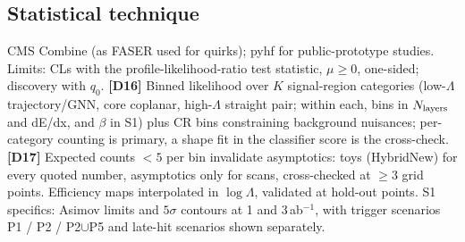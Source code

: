\documentclass[11pt,a4paper]{article}
\newcommand{\lab}[1]{\textbf{[#1]}}
\begin{document}
\subsection{Statistical technique}
CMS Combine (as FASER used for quirks); pyhf for public-prototype studies. Limits: CLs with the profile-likelihood-ratio test statistic, $\mu\geq0$, one-sided; discovery with $q_0$. \lab{D16} Binned likelihood over $K$ signal-region categories (low-$\Lambda$ trajectory/GNN, core coplanar, high-$\Lambda$ straight pair; within each, bins in $N_{\rm layers}$ and dE/dx, and $\beta$ in S1) plus CR bins constraining background nuisances; per-category counting is primary, a shape fit in the classifier score is the cross-check. \lab{D17} Expected counts $<5$ per bin invalidate asymptotics: toys (HybridNew) for every quoted number, asymptotics only for scans, cross-checked at $\geq3$ grid points. Efficiency maps interpolated in $\log\Lambda$, validated at hold-out points. S1 specifics: Asimov limits and $5\sigma$ contours at 1 and 3\,ab$^{-1}$, with trigger scenarios P1 / P2 / P2$\cup$P5 and late-hit scenarios shown separately.
\end{document}
